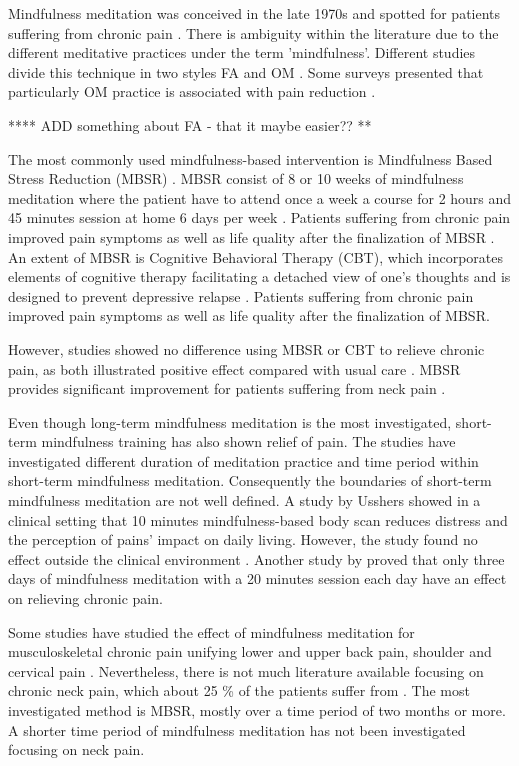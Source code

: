 Mindfulness meditation was conceived in the late 1970s and spotted for patients suffering from chronic pain \cite{Chiesa2010}. There is ambiguity within the literature due to the different meditative practices under the term 'mindfulness'. Different studies divide this technique in two styles FA and OM \cite{Lutz2008,Zeidan2012}. Some surveys presented that particularly OM practice is associated with pain reduction \cite{Grant2009,Perlman2010}. 

 **** ADD something about FA - that it maybe easier?? **

The most commonly used mindfulness-based intervention is Mindfulness Based Stress Reduction (MBSR) \cite{Cramer2012}. MBSR consist of 8 or 10 weeks of mindfulness meditation where the patient have to attend once a week a course for 2 hours and 45 minutes session at home 6 days per week \cite{Kabat1982, Chiesa2010}. Patients suffering from chronic pain improved pain symptoms as well as life quality after the finalization of MBSR \cite{Zeidan2012}.
An extent of MBSR is Cognitive Behavioral Therapy (CBT), which incorporates elements of cognitive therapy facilitating a detached view of one's thoughts and is designed to prevent depressive relapse \cite{Chiesa2010}. Patients suffering from chronic pain improved pain symptoms as well as life quality after the finalization of MBSR. \cite{Zeidan2012} 

However, studies showed no difference using MBSR or CBT to relieve chronic pain, as both illustrated positive effect compared with usual care \cite{Jacob2016,Cherkin2016}. MBSR provides significant improvement for patients suffering from neck pain \cite{Rosenzweig2010}.

Even though long-term mindfulness meditation is the most investigated, short-term mindfulness training has also shown relief of pain. The studies have investigated different duration of meditation practice and time period within short-term mindfulness meditation. Consequently the boundaries of short-term mindfulness meditation are not well defined. A study by Usshers \cite{Ussher2012} showed in a clinical setting that 10 minutes mindfulness-based body scan reduces distress and the perception of pains’ impact on daily living. However, the study found no effect outside the clinical environment \cite{Ussher2012}. Another study by \cite{Zeidan2012} proved that only three days of mindfulness meditation with a 20 minutes session each day have an effect on relieving chronic pain. 

Some studies have studied the effect of mindfulness meditation for musculoskeletal chronic pain unifying lower and upper back pain, shoulder and cervical pain \cite{Chiesa2010}. Nevertheless, there is not much literature available focusing on chronic neck pain, which about 25 \% of the patients suffer from \cite{Macfarlanea2016}. The most investigated method is MBSR, mostly over a time period of two months or more. A shorter time period of mindfulness meditation has not been investigated focusing on neck pain.

